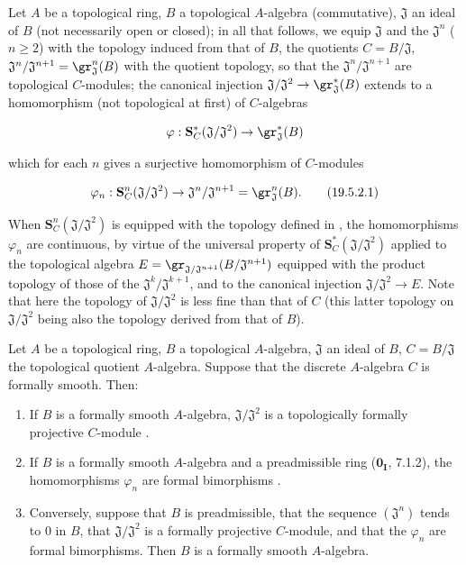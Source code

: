 \begin{env}[19.5.2]
\label{0.19.5.2}
Let $A$ be a topological ring, $B$ a topological $A$-algebra (commutative), $\mathfrak{J}$ an ideal of $B$ (not necessarily open or closed);
in all that follows, we equip $\mathfrak{J}$ and the $\mathfrak{J}^n$ ($n\geq 2$) with the topology induced from that of $B$, the quotients $C=B/\mathfrak{J}$, $\mathfrak{J}^n/\mathfrak{J}^{n+1}=\gr_\mathfrak{J}^n(B)$ with the quotient topology, so that the $\mathfrak{J}^n/\mathfrak{J}^{n+1}$ are topological $C$-modules;
the canonical injection $\mathfrak{J}/\mathfrak{J}^2\to\gr_\mathfrak{J}^*(B)$ extends to a homomorphism (not topological at first) of $C$-algebras

\[
\varphi:\mathbf{S}_C^*(\mathfrak{J}/\mathfrak{J}^2) \to \gr_\mathfrak{J}^*(B)
\]

which for each $n$ gives a surjective homomorphism of $C$-modules

\[
\varphi_n:\mathbf{S}_C^n(\mathfrak{J}/\mathfrak{J}^2) \to \mathfrak{J}^n/\mathfrak{J}^{n+1}=\gr_\mathfrak{J}^n(B). \tag{19.5.2.1}
\]

\label{0.19.5.2.1}

When $\mathbf{S}_C^n(\mathfrak{J}/\mathfrak{J}^2)$ is equipped with the topology defined in , the homomorphisms $\varphi_n$ are continuous, by virtue of the universal property  of $\mathbf{S}_C^*(\mathfrak{J}/\mathfrak{J}^2)$ applied to the topological algebra $E=\gr_{\mathfrak{J}/\mathfrak{J}^{n+1}}(B/\mathfrak{J}^{n+1})$ equipped with the product topology of those of the $\mathfrak{J}^k/\mathfrak{J}^{k+1}$, and to the canonical injection $\mathfrak{J}/\mathfrak{J}^2\to E$.
Note that here the topology of $\mathfrak{J}/\mathfrak{J}^2$ is less fine than that of $C$ (this latter topology on $\mathfrak{J}/\mathfrak{J}^2$ being also the topology derived from that of $B$).
\end{env}

\begin{theorem}[19.5.3]
\label{0.19.5.3}
Let $A$ be a topological ring, $B$ a topological $A$-algebra, $\mathfrak{J}$ an ideal of $B$, $C=B/\mathfrak{J}$ the topological quotient $A$-algebra.
Suppose that the discrete $A$-algebra $C$ is formally smooth.
Then:
\begin{enumerate}
  \item[\rm(i)] If $B$ is a formally smooth $A$-algebra, $\mathfrak{J}/\mathfrak{J}^2$ is a topologically formally projective $C$-module .
  \item[\rm(ii)] If $B$ is a formally smooth $A$-algebra and a preadmissible ring ($\mathbf{0_I}$, 7.1.2), the homomorphisms $\varphi_n$  are formal bimorphisms .
  \item[\rm(iii)] Conversely, suppose that $B$ is preadmissible, that the sequence $(\mathfrak{J}^n)$ tends to $0$ in $B$, that $\mathfrak{J}/\mathfrak{J}^2$ is a formally projective $C$-module, and that the $\varphi_n$ are formal bimorphisms. Then $B$ is a formally smooth $A$-algebra.
\end{enumerate}
\end{theorem}

